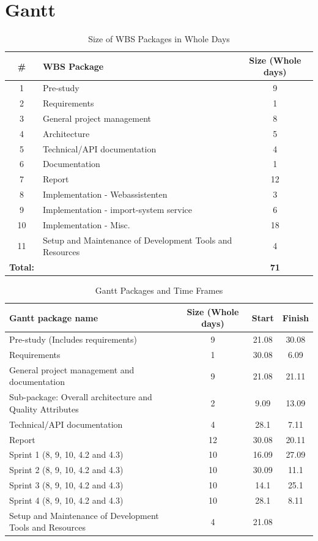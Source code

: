 \section{Gantt}
\begin{table}[H]
\centering
\begin{tabular}{|c|p{8cm}|c|}
\hline
\textbf{\#} & \textbf{WBS Package} & \textbf{Size (Whole days)}\\ 
\hline
1 & Pre-study & 9\\ 
\hline
2 & Requirements & 1\\ 
\hline
3 & General project management & 8\\ 
\hline
4 & Architecture & 5\\ 
\hline
5 & Technical/API documentation & 4\\ 
\hline
6 & Documentation & 1\\ 
\hline
7 & Report & 12\\ 
\hline
8 & Implementation - Webassistenten & 3\\ 
\hline
9 & Implementation - import-system service & 6\\ 
\hline
10 & Implementation - Misc. & 18\\ 
\hline
11 & Setup and Maintenance of Development Tools and Resources & 4\\ 
\hline
\textbf{Total:} &  & \textbf{71}\\ 
\hline\end{tabular}
\label{table:WBSdays}
\caption{\small{Size of WBS Packages in Whole Days}} 
\end{table}

\hspace{-5cm}
\begin{table}[H]
\centering
\begin{tabular}{|p{6cm}|c|c|c|}
\hline
\textbf{Gantt package name} & \textbf{Size (Whole days)} & \textbf{Start} & \textbf{Finish}\\ 
\hline
Pre-study (Includes requirements) & 9 & 21.08 & 30.08\\ 
\hline
Requirements & 1 & 30.08 & 6.09\\ 
\hline
General project management and documentation & 9 & 21.08 & 21.11\\ 
\hline
Sub-package: Overall architecture and Quality Attributes & 2 & 9.09 & 13.09\\ 
\hline
Technical/API documentation & 4 & 28.1 & 7.11\\ 
\hline
Report & 12 & 30.08 & 20.11\\ 
\hline
Sprint 1 (8, 9, 10, 4.2 and 4.3) & 10 & 16.09 & 27.09\\ 
\hline
Sprint 2 (8, 9, 10, 4.2 and 4.3) & 10 & 30.09 & 11.1\\ 
\hline
Sprint 3 (8, 9, 10, 4.2 and 4.3) & 10 & 14.1 & 25.1\\ 
\hline
Sprint 4 (8, 9, 10, 4.2 and 4.3) & 10 & 28.1 & 8.11\\ 
\hline
Setup and Maintenance of Development Tools and Resources & 4 & 21.08 & \\ 
\hline
\end{tabular}
\label{GanttPackages}
\caption{\small{Gantt Packages and Time Frames}} 
\end{table}

